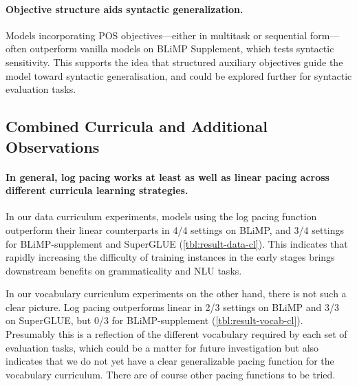 \paragraph{Objective structure aids syntactic generalization.}
Models incorporating POS objectives---either in multitask or sequential form---often outperform vanilla models on BLiMP Supplement, which tests syntactic sensitivity. This supports the idea that structured auxiliary objectives guide the model toward syntactic generalisation, and could be explored further for syntactic evaluation tasks.


\subsection{Combined Curricula and Additional Observations}

\paragraph{In general, log pacing works at least as well as linear pacing across different curricula learning strategies.}
In our data curriculum experiments, models using the log pacing function outperform their linear counterparts in 4/4 settings on BLiMP, and 3/4 settings for BLiMP-supplement and SuperGLUE (\cref{tbl:result-data-cl}). This indicates that rapidly increasing the difficulty of training instances in the early stages brings downstream benefits on grammaticality and NLU tasks.

In our vocabulary curriculum experiments on the other hand, there is not such a clear picture. Log pacing outperforms linear in 2/3 settings on BLiMP and 3/3 on SuperGLUE, but 0/3 for BLiMP-supplement (\cref{tbl:result-vocab-cl}).
Presumably this is a reflection of the different vocabulary required by each set of evaluation tasks, which could be a matter for future investigation but also indicates that we do not yet have a clear generalizable pacing function for the vocabulary curriculum. There are of course other pacing functions to be tried.

